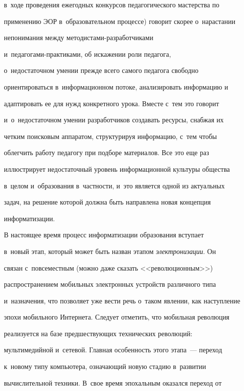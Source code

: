 в~ходе проведения ежегодных конкурсов педагогического мастерства по


применению ЭОР в~образовательном процессе) говорит скорее о~нарастании


непонимания между ме\-то\-ди\-ста\-ми-раз\-ра\-бот\-чи\-ка\-ми


     и~пе\-да\-го\-га\-ми-прак\-ти\-ка\-ми, об искажении роли педагога,


о~недостаточном умении прежде всего самого педагога свободно


ориентироваться в~информационном потоке, анализировать информацию и


адаптировать ее для нужд конкретного урока. Вместе с~тем это говорит


и~о~недостаточном умении разработчиков создавать ресурсы, снабжая их


четким поисковым аппаратом, структурируя информацию, с~тем чтобы


облегчить работу педагогу при подборе материалов. Все это еще раз


иллюстрирует недостаточный уровень информационной культуры общества


в~целом и~образования в~частности, и~это является одной из актуальных


задач, на решение которой должна быть направлена новая концепция


информатизации.





     В настоящее время процесс информатизации образования вступает


в~новый этап, который может быть назван этапом \textit{электронизации}. Он


связан с~повсеместным (можно даже сказать <<революционным>>)


распространением мобильных электронных устройств различного типа


и~назначения, что позволяет уже вести речь о~таком явлении, как наступление


эпохи мобильного Интернета. Следует отметить, что мобильная революция


реализуется на базе предшествующих технических революций:


мультимедийной и~сетевой. Главная особенность этого этапа~--- переход


к~новому типу компьютера, означающий новую стадию в~развитии


вычислительной техники. В~свое время эпохальным оказался переход от


